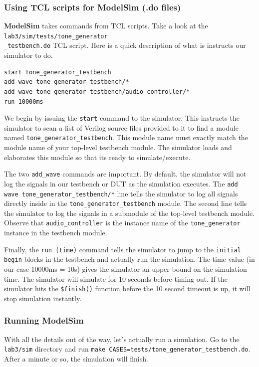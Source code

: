 \documentclass[11pt]{article}
\begin{document}
\subsubsection{Using TCL scripts for ModelSim (.do files)}

\textbf{ModelSim} takes commands from TCL scripts. Take a look at the \verb|lab3/sim/tests/tone_generator|\\\verb|_testbench.do| TCL script. Here is a quick description of what is instructs our simulator to do.

\begin{verbatim}
start tone_generator_testbench
add wave tone_generator_testbench/*
add wave tone_generator_testbench/audio_controller/*
run 10000ms
\end{verbatim}

We begin by issuing the \verb|start| command to the simulator. This instructs the simulator to scan a list of Verilog source files provided to it to find a module named \verb|tone_generator_testbench|. This module name must exactly match the module name of your top-level testbench module. The simulator loads and elaborates this module so that its ready to simulate/execute.

The two \verb|add_wave| commands are important. By default, the simulator will not log the signals in our testbench or DUT as the simulation executes. The \verb|add wave tone_generator_testbench/*| line tells the simulator to log all signals directly inside in the \verb|tone_generator_testbench| module. The second line tells the simulator to log the signals in a submodule of the top-level testbench module. Observe that \verb|audio_controller| is the instance name of the \verb|tone_generator| instance in the testbench module.

Finally, the \verb|run (time)| command tells the simulator to jump to the \verb|initial begin| blocks in the testbench and actually run the simulation. The time value (in our case 10000ms = 10s) gives the simulator an upper bound on the simulation time. The simulator will simulate for 10 seconds before timing out. If the simulator hits the \verb|$finish()| function before the 10 second timeout is up, it will stop simulation instantly.

\subsubsection{Running ModelSim}

With all the details out of the way, let's actually run a simulation. Go to the \verb|lab3/sim| directory and run \verb|make CASES=tests/tone_generator_testbench.do|. After a minute or so, the simulation will finish.
\end{document}
